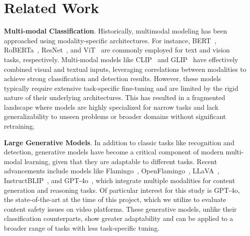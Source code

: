 \section{Related Work}
\label{sec: Related Work}


    
    \textbf{Multi-modal Classification}. Historically, multimodal modeling has been approached using modality-specific architectures. For instance, BERT~\citep{devlin2018bert}, RoBERTa~\citep{liu2019roberta}, ResNet~\citep{he2016deep}, and ViT~\citep{dosovitskiy2020image} are commonly employed for text and vision tasks, respectively. Multi-modal models like CLIP~\citep{radford2021learning} and GLIP~\citep{li2022grounded} have effectively combined visual and textual inputs, leveraging correlations between modalities to achieve strong classification and detection results. However, these models typically require extensive task-specific fine-tuning and are limited by the rigid nature of their underlying architectures. This has resulted in a fragmented landscape where models are highly specialized for narrow tasks and lack generalizability to unseen problems or broader domains without significant retraining.
    
    \textbf{Large Generative Models}. In addition to classic tasks like recognition and detection, generative models have become a critical component of modern multi-modal learning, given that they are adaptable to different tasks. Recent advancements include models like Flamingo~\citep{alayrac2022flamingo}, OpenFlamingo~\citep{awadalla2023openflamingo}, LLaVA~\citep{liu2024visual}, InstructBLIP~\citep{dai2023instructblip}, and GPT-4o~\citep{achiam2023gpt}, which integrate multiple modalities for content generation and reasoning tasks. Of particular interest for this study is GPT-4o, the state-of-the-art at the time of this project, which we utilize to evaluate content safety issues on video platforms. These generative models, unlike their classification counterparts, show greater adaptability and can be applied to a broader range of tasks with less task-specific tuning.